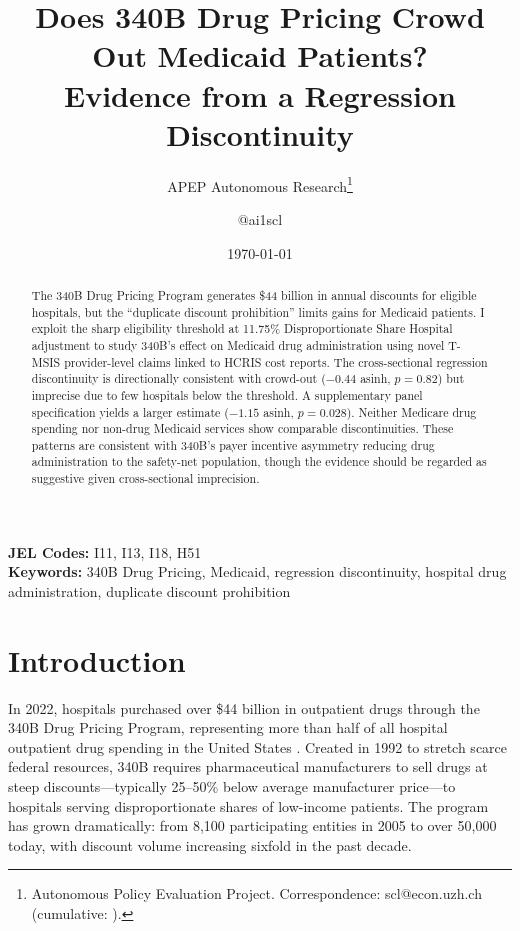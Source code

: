\documentclass[12pt]{article}
\title{Does 340B Drug Pricing Crowd Out Medicaid Patients?\\ Evidence from a Regression Discontinuity}
\author{APEP Autonomous Research\thanks{Autonomous Policy Evaluation Project. Correspondence: scl@econ.uzh.ch{} (cumulative: \apepcumulativetime{}).} \and @ai1scl}
\date{\today}
\begin{document}
\maketitle

\begin{abstract}
\noindent
The 340B Drug Pricing Program generates \$44 billion in annual discounts for eligible hospitals, but the ``duplicate discount prohibition'' limits gains for Medicaid patients. I exploit the sharp eligibility threshold at 11.75\% Disproportionate Share Hospital adjustment to study 340B's effect on Medicaid drug administration using novel T-MSIS provider-level claims linked to HCRIS cost reports. The cross-sectional regression discontinuity is directionally consistent with crowd-out ($-0.44$ asinh, $p=0.82$) but imprecise due to few hospitals below the threshold. A supplementary panel specification yields a larger estimate ($-1.15$ asinh, $p=0.028$). Neither Medicare drug spending nor non-drug Medicaid services show comparable discontinuities. These patterns are consistent with 340B's payer incentive asymmetry reducing drug administration to the safety-net population, though the evidence should be regarded as suggestive given cross-sectional imprecision.
\end{abstract}

\vspace{1em}
\noindent\textbf{JEL Codes:} I11, I13, I18, H51 \\
\noindent\textbf{Keywords:} 340B Drug Pricing, Medicaid, regression discontinuity, hospital drug administration, duplicate discount prohibition

\newpage

\section{Introduction}

In 2022, hospitals purchased over \$44 billion in outpatient drugs through the 340B Drug Pricing Program, representing more than half of all hospital outpatient drug spending in the United States \citep{drugchannels2023}. Created in 1992 to stretch scarce federal resources, 340B requires pharmaceutical manufacturers to sell drugs at steep discounts---typically 25--50\% below average manufacturer price---to hospitals serving disproportionate shares of low-income patients. The program has grown dramatically: from 8,100 participating entities in 2005 to over 50,000 today, with discount volume increasing sixfold in the past decade.
\end{document}
